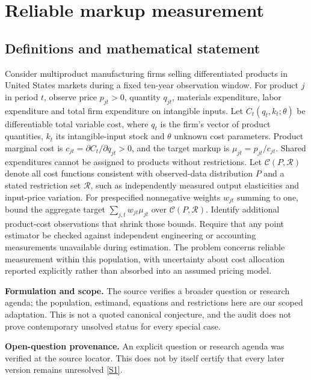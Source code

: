 \documentclass[11pt]{article}
\newcommand{\sref}[2]{\hyperlink{source:#1:#2}{[S#2]}}
\begin{document}
\section*{Reliable markup measurement}\label{30007673}
\subsection{Definitions and mathematical statement}
Consider multiproduct manufacturing firms selling differentiated products in United States markets during a fixed ten-year observation window. For product \(j\) in period \(t\), observe price \(p_{jt}>0\), quantity \(q_{jt}\), materials expenditure, labor expenditure and total firm expenditure on intangible inputs. Let \(C_t(q_t,k_t;\theta)\) be differentiable total variable cost, where \(q_t\) is the firm's vector of product quantities, \(k_t\) its intangible-input stock and \(\theta\) unknown cost parameters. Product marginal cost is \(c_{jt}=\partial C_t/\partial q_{jt}>0\), and the target markup is \(\mu_{jt}=p_{jt}/c_{jt}\). Shared expenditures cannot be assigned to products without restrictions. Let \(\mathcal C(P,\mathcal R)\) denote all cost functions consistent with observed-data distribution \(P\) and a stated restriction set \(\mathcal R\), such as independently measured output elasticities and input-price variation. For prespecified nonnegative weights \(w_{jt}\) summing to one, bound the aggregate target \(\sum_{j,t}w_{jt}\mu_{jt}\) over \(\mathcal C(P,\mathcal R)\). Identify additional product-cost observations that shrink those bounds. Require that any point estimator be checked against independent engineering or accounting measurements unavailable during estimation. The problem concerns reliable measurement within this population, with uncertainty about cost allocation reported explicitly rather than absorbed into an assumed pricing model.

\par\textbf{Formulation and scope.} The source verifies a broader question or research agenda; the population, estimand, equations and restrictions here are our scoped adaptation. This is not a quoted canonical conjecture, and the audit does not prove contemporary unsolved status for every special case.

\par\textbf{Open-question provenance.} An explicit question or research agenda was verified at the source locator. This does not by itself certify that every later version remains unresolved \sref{30007673}{1}.
\end{document}
